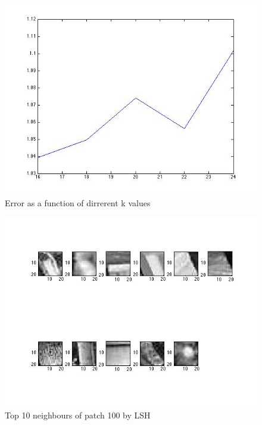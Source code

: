 \documentclass{article}
\begin{document}
\begin{figure}
\centering
\includegraphics[scale=0.5]{lsh/errs_k.jpg}
\caption{Error as a function of dirrerent k values}
\label{threadsVsSync}
\end{figure}

\begin{figure}
\centering
\includegraphics[scale=0.5]{lsh/neighbours_of_100_by_lsh.jpg}
\caption{Top 10 neighbours of patch 100 by LSH}
\label{threadsVsSync}
\end{figure}
\end{document}
